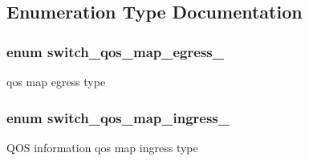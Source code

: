 \subsection{Enumeration Type Documentation}
\hypertarget{group__QOS_ga0ad3378e0f7558be2c199c5665436c39}{
\subsubsection[{switch\+\_\+qos\+\_\+map\+\_\+egress\+\_\+}]{\setlength{\rightskip}{0pt plus 5cm}enum {\bf switch\+\_\+qos\+\_\+map\+\_\+egress\+\_\+}}}\label{group__QOS_ga0ad3378e0f7558be2c199c5665436c39}
qos map egress type \hypertarget{group__QOS_ga31ec012ceb021095a2de97a1a3438612}{
\subsubsection[{switch\+\_\+qos\+\_\+map\+\_\+ingress\+\_\+}]{\setlength{\rightskip}{0pt plus 5cm}enum {\bf switch\+\_\+qos\+\_\+map\+\_\+ingress\+\_\+}}}\label{group__QOS_ga31ec012ceb021095a2de97a1a3438612}
Q\+O\+S information qos map ingress type 

